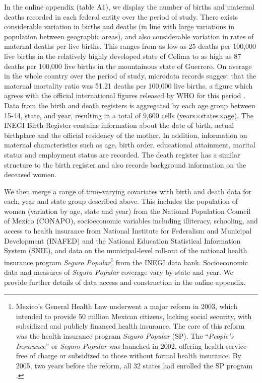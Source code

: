 \documentclass[a4paper, 11pt]{article}
\begin{document}
\begin{spacing}{2}
In the online appendix (table A1), we display the number of births and maternal deaths recorded in each federal entity over the period of study.  There exists considerable variation in births and deaths (in line with large variations in population between geographic areas), and also considerable variation in rates of maternal deaths per live births.  This ranges from as low as 25 deaths per 100,000 live births in the relatively highly developed state of Colima to as high as 87 deaths per 100,000 live births in the mountainous state of Guerrero.  On average in the whole country over the period of study, microdata records suggest that the maternal mortality ratio was 51.21 deaths per 100,000 live births, a figure which agrees with the official international figures released by WHO for this period \citep{WHO2015}.   Data from the birth and death registers is aggregated by each age group between 15-44, state, and year, resulting in a total of 9,600 cells (years$\times$states$\times$age). The INEGI Birth Register contains information about the date of birth, actual birthplace and the official residency of the mother. In addition, information on maternal characteristics such as age, birth order, educational attainment, marital status and employment status are recorded. The death register has a similar structure to the birth register and also records background information on the deceased women.

We then merge a range of time-varying covariates with birth and death data for each, year and state group described above.  This includes the population of women (variation by age, state and year) from the National Population Council of Mexico (CONAPO), socioeconomic variables including illiteracy, schooling, and access to health insurance from National Institute for Federalism and Municipal Development (INAFED) and the National Education Statistical Information System (SNIE), and data on the municipal-level roll-out of the national health insurance program \emph{Seguro Popular}\footnote{Mexico's General Health Law underwent a major reform in 2003, which intended to provide 50 million Mexican citizens, lacking social security, with subsidized and publicly financed health insurance. The core of this reform was the health insurance program \textit{Seguro Popular} (SP). The ``\textit{People’s Insurance}'' or \textit{Seguro Popular} was launched in 2002, offering health service free of charge or subsidized to those without formal health insurance. By 2005, two years before the reform, all 32 states had enrolled the SP program \citep{Knauletal2007}.} from the INEGI data bank.  Socioeconomic data and measures of \emph{Seguro Popular} coverage vary by state and year.  We provide further details of data access and construction in the online appendix.


\end{spacing}
\end{document}
